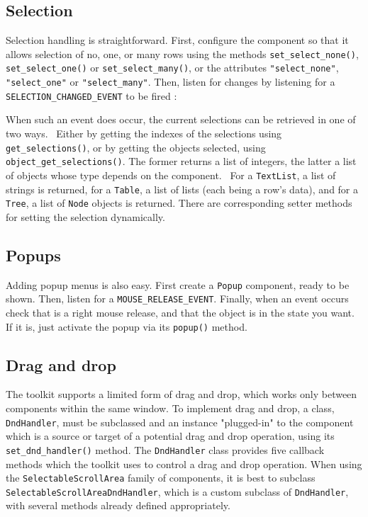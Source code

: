 \subsection{Selection}

Selection handling is straightforward. First, configure the component
so that it allows selection of no, one, or many rows using the methods
\texttt{set\_select\_none()}, \texttt{set\_select\_one()} or
\texttt{set\_select\_many()}, or the attributes
\texttt{"select\_none"}, \texttt{"select\_one"} or \texttt{"select\_many"}.
Then, listen for changes by listening for a
\texttt{SELECTION\_CHANGED\_EVENT} to be fired :


When such an event does occur, the current selections can be retrieved
in one of two ways. \ Either by getting the indexes of the selections
using \texttt{get\_selections()}, or by getting the objects selected,
using \texttt{object\_get\_selections()}. The former returns a list
of integers, the latter a list of objects whose type depends on the
component. \ For a \texttt{TextList}, a list of strings is returned,
for a \texttt{Table}, a list of lists (each being a
row's data), and for a \texttt{Tree}, a list of
\texttt{Node} objects is returned.
There are corresponding setter methods for setting the selection dynamically.


\subsection{Popups}

Adding popup menus is also easy. First create a \texttt{Popup}
component, ready to be shown. Then, listen for a
\texttt{MOUSE\_RELEASE\_EVENT}. Finally, when an event occurs check
that is a right mouse release, and that the object is in the state you
want. If it is, just activate the popup via its \texttt{popup()}
method.

\subsection{Drag and drop}

The toolkit supports a limited form of drag and drop, which works only between
components within the same window.
To implement drag and drop, a class, \texttt{DndHandler}, must be
subclassed and an instance "plugged-in" to
the component which is a source or target of a potential drag and drop
operation, using its \texttt{set\_dnd\_handler()} method.
The \texttt{DndHandler} class provides five callback methods which the
toolkit uses to control a drag and drop operation.
When using the \texttt{SelectableScrollArea} family of components, it is
best to subclass \texttt{SelectableScrollAreaDndHandler}, which is a
custom subclass of \texttt{DndHandler}, with several methods already
defined appropriately.

